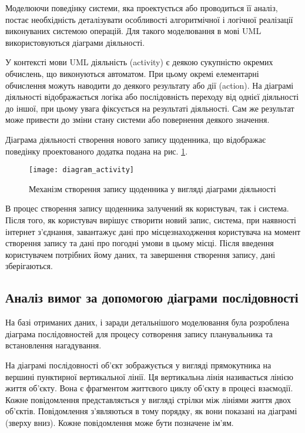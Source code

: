 \documentclass[../main.tex]{subfiles}
\begin{document}
Моделюючи поведінку системи, яка проектується або проводиться її аналіз, постає необхідність деталізувати особливості алгоритмічної і логічної реалізації виконуваних системою операцій. Для такого моделювання в мові UML використовуються діаграми діяльності.

У контексті мови UML діяльність (activity) є деякою сукупністю окремих обчислень, що виконуються автоматом. При цьому окремі елементарні обчислення можуть наводити до деякого результату або дії (action). На діаграмі діяльності відображається логіка або послідовність переходу від однієї діяльності до іншої, при цьому увага фіксується на результаті діяльності. Сам же результат може привести до зміни стану системи або повернення деякого значення.

Діаграма діяльності створення нового запису щоденника, що відображає поведінку проектованого додатка подана на рис. \ref{diagram:activity}.

\begin{figure}[H]
	\centering
	\texttt{[image: diagram\_activity]}
	\caption{Механізм створення запису щоденника у вигляді діаграми діяльності}
	\label{diagram:activity}
\end{figure}

В процес створення запису щоденника залучений як користувач, так і система. Після того, як користувач вирішує створити новий запис, система, при наявності інтернет з'єднання, завантажує дані про місцезнаходження користувача на момент створення запису та дані про погодні умови в цьому місці. Після введення користувачем потрібних йому даних, та завершення створення запису, дані зберігаються.

\subsection{Аналіз вимог за допомогою діаграми послідовності}
На базі отриманих даних, і заради детальнішого моделювання була розроблена діаграма послідовностей для процесу сотворення запису планувальника та встановлення нагадування.

На діаграмі послідовності об’єкт зображується у вигляді прямокутника на вершині пунктирної вертикальної лінії. Ця вертикальна лінія називається лінією життя об’єкту. Вона є фрагментом життєвого циклу об’єкту в процесі взаємодії. Кожне повідомлення представляється у вигляді стрілки між лініями життя двох об’єктів. Повідомлення з’являються в тому порядку, як вони показані на діаграмі (зверху вниз). Кожне повідомлення може бути позначене ім’ям.
\end{document}
